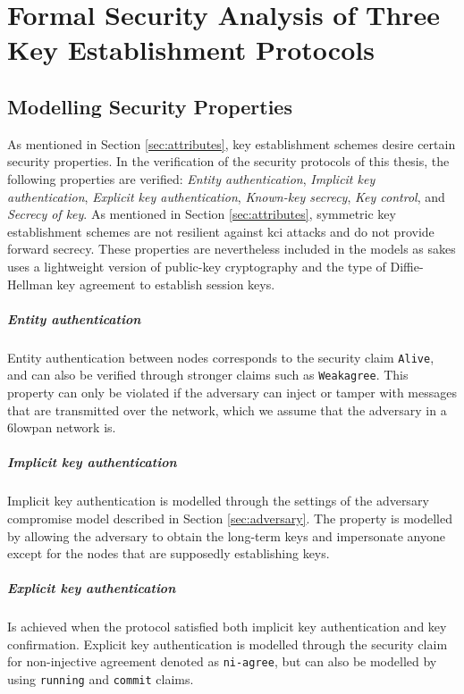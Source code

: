 \chapter{Formal Security Analysis of Three Key Establishment Protocols}
\label{chp:analysis}


\section{Modelling Security Properties}

As mentioned in Section \ref{sec:attributes}, key establishment schemes desire certain security properties. In the verification of the security protocols of this thesis, the following properties are verified: \emph{Entity authentication}, \emph{Implicit key authentication}, \emph{Explicit key authentication}, \emph{Known-key secrecy}, \emph{Key control}, and \emph{Secrecy of key}. As mentioned in Section \ref{sec:attributes}, symmetric key establishment schemes are not resilient against \gls{kci} attacks and do not provide forward secrecy. These properties are nevertheless included in the models as \gls{sakes} uses a lightweight version of public-key cryptography and the type of Diffie-Hellman key agreement to establish session keys.

\paragraph{Entity authentication} Entity authentication between nodes corresponds to the security claim \texttt{Alive}, and can also be verified through stronger claims such as \texttt{Weakagree}. This property can only be violated if the adversary can inject or tamper with messages that are transmitted over the network, which we assume that the adversary in a \gls{6lowpan} network is.

\paragraph{Implicit key authentication} Implicit key authentication is modelled through the settings of the adversary compromise model described in Section \ref{sec:adversary}. The property is modelled by allowing the adversary to obtain the long-term keys and impersonate anyone except for the nodes that are supposedly establishing keys.

\paragraph{Explicit key authentication} Is achieved when the protocol satisfied both implicit key authentication and key confirmation. Explicit key authentication is modelled through the security claim for non-injective agreement denoted as \texttt{ni-agree}, but can also be modelled by using \texttt{running} and \texttt{commit} claims.

